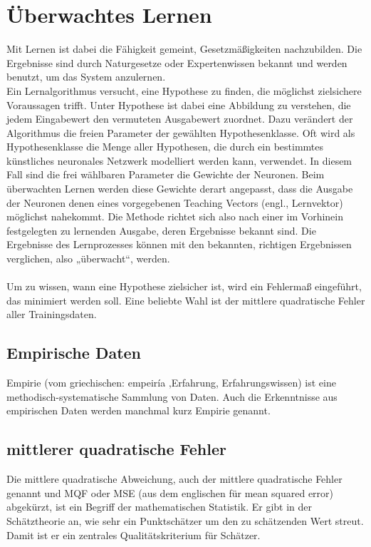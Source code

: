 \chapter{Überwachtes Lernen}
Mit Lernen ist dabei die Fähigkeit gemeint, Gesetzmäßigkeiten nachzubilden.
Die Ergebnisse sind durch Naturgesetze oder Expertenwissen bekannt und werden benutzt,
um das System anzulernen.
\\
Ein Lernalgorithmus versucht, eine Hypothese zu finden, die möglichst zielsichere Voraussagen trifft. Unter Hypothese ist dabei eine Abbildung zu verstehen, die jedem Eingabewert den vermuteten Ausgabewert zuordnet. Dazu verändert der Algorithmus die freien Parameter der gewählten Hypothesenklasse. Oft wird als Hypothesenklasse die Menge aller Hypothesen, die durch ein bestimmtes künstliches neuronales Netzwerk modelliert werden kann, verwendet. In diesem Fall sind die frei wählbaren Parameter die Gewichte der Neuronen. Beim überwachten Lernen werden diese Gewichte derart angepasst, dass die Ausgabe der Neuronen denen eines vorgegebenen Teaching Vectors (engl., Lernvektor) möglichst nahekommt. Die Methode richtet sich also nach einer im Vorhinein festgelegten zu lernenden Ausgabe, deren Ergebnisse bekannt sind. Die Ergebnisse des Lernprozesses können mit den bekannten, richtigen Ergebnissen verglichen, also „überwacht“, werden. \\
\\
Um zu wissen, wann eine Hypothese zielsicher ist, wird ein Fehlermaß eingeführt, das minimiert werden soll. Eine beliebte Wahl ist der mittlere quadratische Fehler aller Trainingsdaten.

\section{Empirische Daten}
Empirie (vom griechischen: empeiría ‚Erfahrung, Erfahrungswissen) ist eine methodisch-systematische Sammlung von Daten. Auch die Erkenntnisse aus empirischen Daten werden manchmal kurz Empirie genannt.

\section{mittlerer quadratische Fehler}
Die mittlere quadratische Abweichung, auch der mittlere quadratische Fehler genannt und MQF oder MSE (aus dem englischen für mean squared error) abgekürzt, ist ein Begriff der mathematischen Statistik. Er gibt in der Schätztheorie an, wie sehr ein Punktschätzer um den zu schätzenden Wert streut. Damit ist er ein zentrales Qualitätskriterium für Schätzer.

